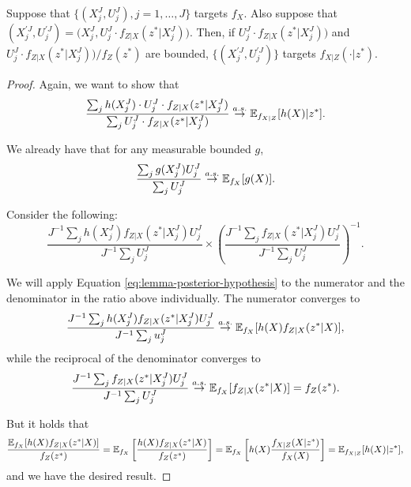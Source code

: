 \begin{lem}
    \label{lem:posterior-proper-weights}
    Suppose that $\{(X_j^J,U_j^J),j=1,\dots,J\}$ targets $f_X$. Also suppose that $(X^{\prime J}_j,U^{\prime J}_j) = \big(X_j^J,U_j^J \cdot f_{Z|X}(z^*|X_j^J)\big)$. Then, if $U_j^J \cdot f_{Z|X}(z^*|X_j^J)\big)$ and $U_j^J \cdot f_{Z|X}(z^*|X_j^J)\big) / f_Z(z^*)$ are bounded, $\{(X^{\prime J}_j,U^{\prime J}_j)\}$ targets $f_{X|Z}(\cdot | z^*)$.
\end{lem}

\begin{proof}

    Again, we want to show that
     $$\frac{\sum_j h(X_j^J) \cdot U_j^J \cdot f_{Z|X}(z^*|X_j^J)}{\sum_j U_j^J \cdot f_{Z|X}(z^*|X_j^J)} \stackrel{a.s.}{\to} \mathbb{E}_{f_{X|Z}}[h(X)|z^*].$$

    We already have that for any measurable bounded $g$,
    \begin{equation}
        \frac{\sum_j g(X_j^J)U_j^J}{\sum_j U_j^J} \stackrel{a.s.}{\to} \mathbb{E}_{f_X}[g(X)].
        \label{eq:lemma-posterior-hypothesis}
    \end{equation}
    
    Consider the following:
    \begin{equation}
    \frac{J^{-1} \sum_j h(X_j^J) f_{Z|X}(z^*|X_j^J) {U}_j^{J}}{J^{-1} \sum_j {U}_j^{J}}
    \times \left( \frac{J^{-1} \sum_j f_{Z|X}(z^*|X_j^J) {U}_j^{J}}{J^{-1} \sum_j {U}_j^{J}} \right)^{-1}.
    \end{equation}

    We will apply Equation \ref{eq:lemma-posterior-hypothesis} to the numerator and the denominator in the ratio above individually. The numerator converges to 
    $$\frac{J^{-1} \sum_j h(X_j^J) f_{Z|X}(z^*|X_j^J) {U}_j^{J}}{J^{-1} \sum_j {u}_j^{J}} \stackrel{a.s.}{\to} \mathbb{E}_{f_X}[h(X)f_{Z|X}(z^*|X)],$$
    while the reciprocal of the denominator converges to 
    $$ \frac{J^{-1} \sum_j f_{Z|X}(z^*|X_j^J) {U}_j^{J}}{J^{-1} \sum_j {U}_j^{J}}  \stackrel{a.s.}{\to} \mathbb{E}_{f_X}[f_{Z|X}(z^*|X)] = f_Z(z^*).$$

    
    But it holds that
    $$\frac{\mathbb{E}_{f_X}[h(X)f_{Z|X}(z^*|X)]}{f_Z(z^*)} = \mathbb{E}_{f_X}\left[\frac{h(X)f_{Z|X}(z^*|X)}{f_Z(z^*)}\right] = \mathbb{E}_{f_X}\left[h(X)\frac{f_{X|Z}(X|z^*)}{f_X(X)}\right] =  \mathbb{E}_{f_{X|Z}}[h(X)|z^*],$$
    and we have the desired result.
    

\end{proof}
